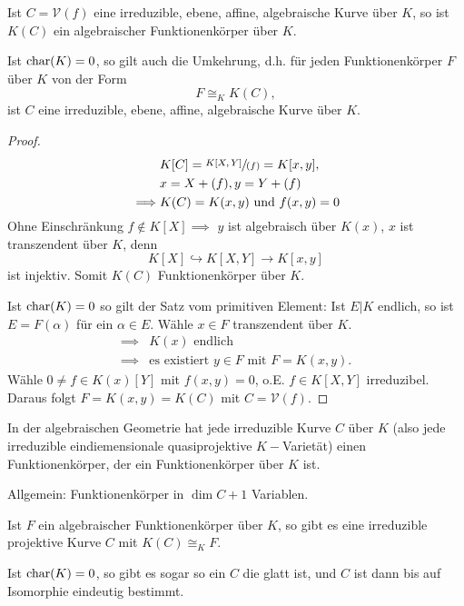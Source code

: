 \begin{satz}
    Ist $C = \mathcal{V}(f)$ eine irreduzible, ebene, affine, algebraische Kurve über $K$, so ist $K(C)$ ein
    algebraischer Funktionenkörper über $K$.

    Ist $\operatorname{char}(K) = 0$, so gilt auch die Umkehrung, d.h. für jeden Funktionenkörper $F$ über $K$ von der Form
    $$F \cong_K K(C),$$ ist $C$ eine irreduzible, ebene, affine, algebraische Kurve über $K$.
\end{satz}
\begin{proof}
    \begin{align*}
        &K[C] = \sfrac{K[X,Y]}{(f)} = K[x,y], \\
        &x = X + (f), y = Y + (f)\\
        \implies & K(C) = K(x,y) \text{ und } f(x,y) = 0
    \end{align*}
    Ohne Einschränkung $f \notin K[X] \implies$ $y$ ist algebraisch über $K(x)$,
    $x$ ist transzendent über $K$, denn
    $$ K[X] \hookrightarrow K[X,Y] \to K[x,y] $$
    ist injektiv. Somit $K(C)$ Funktionenkörper über $K$.

    Ist $\operatorname{char}(K) = 0$ so gilt der Satz vom primitiven Element:
    Ist $E|K$ endlich, so ist $E = F(\alpha)$ für ein $\alpha \in E$.
    Wähle $x \in F$ transzendent über $K$.
    \begin{align*}
        \implies & K(x) \text{ endlich}\\
        \implies & \text{es existiert } y \in F \text{ mit } F=K(x,y).
    \end{align*} 
    Wähle $0 \neq f \in K(x)[Y]$ mit $f(x,y) =0$, o.E. $f \in K[X,Y]$ irreduzibel.
    Daraus folgt $F = K(x,y)=K(C)$ mit $C = \mathcal{V}(f)$.
\end{proof}

\begin{bemerkungnr}
    In der algebraischen Geometrie hat jede irreduzible Kurve $C$ über $K$ (also jede irreduzible
    eindiemensionale quasiprojektive $K-$Varietät) einen Funktionenkörper, der ein Funktionenkörper
    über $K$ ist. 
    
    Allgemein: Funktionenkörper in $\dim C + 1$ Variablen.
\end{bemerkungnr}

\begin{theorem}
    Ist $F$ ein algebraischer Funktionenkörper über $K$, so gibt es eine irreduzible projektive Kurve
    $C$ mit $K(C) \cong_K F$.
    
    Ist $\operatorname{char}(K)=0$, so gibt es sogar so ein $C$ die glatt ist, und $C$ ist dann bis auf Isomorphie eindeutig bestimmt.
\end{theorem}

